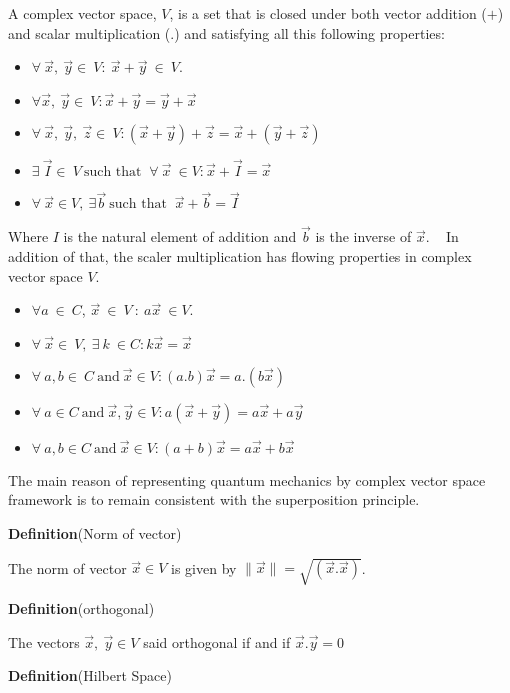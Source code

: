 A complex vector space, $V$, is a set that is closed under both vector addition
($ +$) and scalar multiplication (.) and satisfying all this following properties:
\begin{itemize}
\item $\forall~ \vec{x},~\vec{y} \in ~ V : ~\vec{x}+\vec{y} ~\in~ V $.
\item $\forall \vec{x},~\vec{y} \in ~ V : \vec{x}+\vec{y}=\vec{y}+\vec{x}$
\item $\forall~ \vec{x},~\vec{y}, ~\vec{z} \in ~ V:\left(\vec{x}+\vec{y}\right)+\vec{z}=\vec{x}+\left(\vec{y}+\vec{z}\right)$
\item $\exists ~\vec{I} \in ~V~ \text{such that }~  \forall~ \vec{x} ~\in  V: \vec{x}+\vec{I}=\vec{x}$
\item $\forall ~\vec{x} \in V,~ \exists \vec{b} ~ \text{such that }  ~\vec{x}+\vec{b}= \vec{I}$
\end{itemize}
Where $I$ is the natural element of addition and $\vec{b}$ is the inverse of $\vec{x}$. ~
In addition  of that, the scaler  multiplication has flowing properties in complex vector space $V$.
\begin{itemize}
\item $\forall a~\in ~C$, $\vec{x}~\in ~V~ :~ a\vec{x}~ \in V$.
\item $\forall ~\vec{x} \in ~V,~ \exists~ k ~\in C :k\vec{x}=\vec{x}$
\item $\forall ~ a,b \in ~C ~\text{and} ~ \vec{x}\in V :\left(a.b\right) \vec{x}=a.\left(b \vec{x}\right)$
\item $\forall ~ a \in C ~\text{and} ~ \vec{x}, \vec{y}\in V:a\left(\vec{x}+\vec{y}\right)=a\vec{x}+a\vec{y}$
\item $\forall ~ a,b \in C ~\text{and} ~ \vec{x}\in V:\left(a+b\right)\vec{x}=a\vec{x}+b\vec{x}$
\end{itemize}
The main reason of representing quantum mechanics by complex  vector space framework is to remain consistent with the superposition principle.

\textbf{Definition}{(Norm of vector)}

The norm of vector $\vec{x} \in V$ is given by $\parallel \vec{x}\parallel=\sqrt{\left(\vec{x}.\vec{x}\right)}$.


\textbf{Definition}{(orthogonal)}

The vectors $\vec{x},~ \vec{y} \in V$ said orthogonal if and if $\vec{x}.\vec{y}=0$

\textbf{Definition}{(Hilbert Space)}

